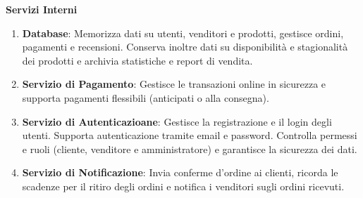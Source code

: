 \begin{attori}
\begin{enumerate}
\begin{enumerate}
         \end{enumerate}
     \end{enumerate}
 
     \item \textbf{Servizi Interni}
     \begin{enumerate}
         \item \textbf{Database}: Memorizza dati su utenti, venditori e prodotti, gestisce ordini, pagamenti e recensioni. Conserva inoltre dati su disponibilità e stagionalità dei prodotti e archivia statistiche e report di vendita.
         \item \textbf{Servizio di Pagamento}: Gestisce le transazioni online in sicurezza e supporta pagamenti flessibili (anticipati o alla consegna).
         \item \textbf{Servizio di Autenticazioane}: Gestisce la registrazione e il login degli utenti. Supporta autenticazione tramite email e password. Controlla permessi e ruoli (cliente, venditore e amministratore) e garantisce la sicurezza dei dati.
         \item \textbf{Servizio di Notificazione}: Invia conferme d’ordine ai clienti, ricorda le scadenze per il ritiro degli ordini e notifica i venditori sugli ordini ricevuti. 
     \end{enumerate}
 \end{attori}

\newpage